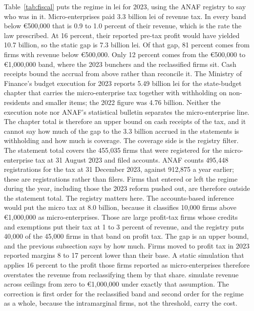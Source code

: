 \documentclass[12pt]{article}
\begin{document}
Table~\ref{tab:fiscal} puts the regime in lei for 2023, using the ANAF registry to say who was in it. Micro-enterprises paid 3.3 billion lei of revenue tax. In every band below \euro{}500,000 that is 0.9 to 1.0 percent of their revenue, which is the rate the law prescribed. At 16 percent, their reported pre-tax profit would have yielded 10.7 billion, so the static gap is 7.3 billion lei. Of that gap, 81 percent comes from firms with revenue below \euro{}500,000. Only 12 percent comes from the \euro{}500,000 to \euro{}1,000,000 band, where the 2023 bunchers and the reclassified firms sit. Cash receipts bound the accrual from above rather than reconcile it. The Ministry of Finance's budget execution for 2023 \citep{mf2024} reports 5.49 billion lei for the state-budget chapter that carries the micro-enterprise tax together with withholding on non-residents and smaller items; the 2022 figure was 4.76 billion. Neither the execution note nor ANAF's statistical bulletin separates the micro-enterprise line. The chapter total is therefore an upper bound on cash receipts of the tax, and it cannot say how much of the gap to the 3.3 billion accrued in the statements is withholding and how much is coverage. The coverage side is the registry filter. The statement total covers the 455,035 firms that were registered for the micro-enterprise tax at 31 August 2023 and filed accounts. ANAF counts 495,448 registrations for the tax at 31 December 2023, against 912,875 a year earlier; these are registrations rather than filers. Firms that entered or left the regime during the year, including those the 2023 reform pushed out, are therefore outside the statement total. The registry matters here. The accounts-based inference would put the micro tax at 8.0 billion, because it classifies 10,000 firms above \euro{}1,000,000 as micro-enterprises. Those are large profit-tax firms whose credits and exemptions put their tax at 1 to 3 percent of revenue, and the registry puts 40,000 of the 45,000 firms in that band on profit tax. The gap is an upper bound, and the previous subsection says by how much. Firms moved to profit tax in 2023 reported margins 8 to 17 percent lower than their base. A static simulation that applies 16 percent to the profit those firms reported as micro-enterprises therefore overstates the revenue from reclassifying them by that share. \citet{ban2023} simulate revenue across ceilings from zero to \euro{}1,000,000 under exactly that assumption. The correction is first order for the reclassified band and second order for the regime as a whole, because the intramarginal firms, not the threshold, carry the cost.
\end{document}
